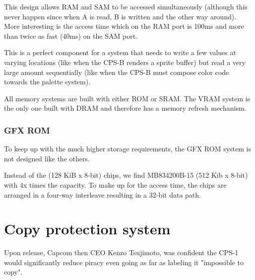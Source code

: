 This design allows RAM and SAM to be accessed simultaneously (although this never happen since when A is read, B is written and the other way around).
 More interesting is the access time which on the RAM port is 100ms and more than twice as fast (40ms) on the SAM port. 

 This is a perfect component for a system that needs to write a few values at varying locations (like when the CPS-B renders a sprite buffer) but read a very large amount sequentially (like when the CPS-B must compose color code towards the palette system).

\pagebreak




\begin{trivia}
All memory systems are built with either ROM or SRAM. The VRAM system is the only one built with DRAM and therefore has a memory refresh mechanism.
\end{trivia}


\subsubsection{GFX ROM}
To keep up with the much higher storage requirements, the GFX ROM system is not designed like the others.

Instead of the  (128 KiB x 8-bit) chips, we find MB834200B-15 (512 Kib x 8-bit) with 4x times the capacity. To make up for the access time, the chips are arranged in a four-way interleave resulting in a 32-bit data path.

\pagebreak


\section{Copy protection system}

Upon release, Capcom then CEO Kenzo Tsujimoto, was confident the CPS-1 would significantly reduce piracy even going as far as labeling it "impossible to copy".

